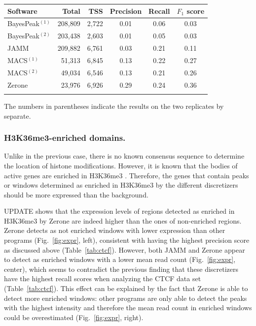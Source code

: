 \documentclass{bioinfo}
\begin{document}
\begin{table}[!t]
{\begin{tabular}{lrrccc}
        \toprule
        \textbf{Software}  & \textbf{Total}  & \textbf{TSS} &
        \textbf{Precision} & \textbf{Recall} & \textbf{$F_{1}$ score} \\
        \midrule
        BayesPeak$^{(1)}$ & 208,809 & 2,722 & 0.01 & 0.06 & 0.03 \\
        BayesPeak$^{(2)}$ & 203,438 & 2,603 & 0.01 & 0.05 & 0.03 \\
        JAMM              & 209,882 & 6,761 & 0.03 & 0.21 & 0.11 \\
        MACS$^{(1)}$      &  51,313 & 6,845 & 0.13 & 0.22 & 0.27 \\
        MACS$^{(2)}$      &  49,034 & 6,546 & 0.13 & 0.21 & 0.26 \\
        Zerone            &  23,976 & 6,926 & 0.29 & 0.24 & 0.36 \\
        \botrule
\end{tabular}}{The numbers in parentheses indicate the results on the two
replicates by separate.}
\end{table}

\subsubsection{H3K36me3-enriched domains.}
Unlike in the previous case, there is no known consensus sequence
to determine the location of histone modifications. However, it is
known that the bodies of active genes are enriched in H3K36me3
\citep{pmid16122420,pmid23739122}. Therefore, the genes that contain
peaks or windows determined as enriched in H3K36me3 by the different
discretizers should be more expressed than the background.

UPDATE shows that the expression levels of regions detected as
enriched in H3K36me3 by Zerone are indeed higher than the ones of non-enriched
regions. Zerone detects as not enriched windows with lower expression than other
programs (Fig.~\ref{fig:expr}, left), consistent with having the highest
precision score as discussed above (Table~\ref{tab:ctcf}). However, both JAMM
and Zerone appear to detect as enriched windows with a lower mean read count
(Fig.~\ref{fig:expr}, center), which seems to contradict the previous finding
that these discretizers have the highest recall scores when analyzing the CTCF
data set (Table~\ref{tab:ctcf}). This effect can be explained by the fact that
Zerone is able to detect more enriched windows: other programs are only able to
detect the peaks with the highest intensity and therefore the mean read count in
enriched windows could be overestimated (Fig.~\ref{fig:expr}, right).
\end{document}
